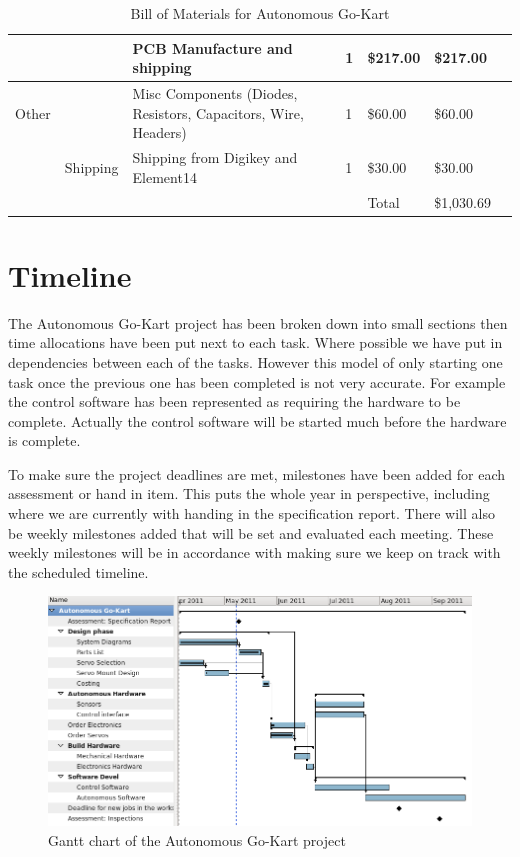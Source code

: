 \begin{table}[h]
\begin{center}
\begin{tabular}{ | l | l | p{} | l | l | l | l | }
      &  & PCB Manufacture and shipping & 1 & \$217.00 & \$217.00 \\
      \hline
      Other &  & Misc Components (Diodes, Resistors, Capacitors, Wire, Headers) & 1 & \$60.00 & \$60.00 \\
      & Shipping & Shipping from Digikey and Element14 & 1 & \$30.00 & \$30.00 \\
      \hline
      &  &  &  & Total & \$1,030.69 \\
      \hline
    \end{tabular}
  \end{center}
  \caption{Bill of Materials for Autonomous Go-Kart}
\end{table}



\section{Timeline}
The Autonomous Go-Kart project has been broken down into small sections then
time allocations have been put next to each task. Where possible we have put in
dependencies between each of the tasks. However this model of only starting one
task once the previous one has been completed is not very accurate. For example
the control software has been represented as requiring the hardware to be
complete. Actually the control software will be started much before the hardware
is complete.

To make sure the project deadlines are met, milestones have been added for each
assessment or hand in item. This puts the whole year in perspective, including
where we are currently with handing in the specification report. There will also
be weekly milestones added that will be set and evaluated each meeting. These
weekly milestones will be in accordance with making sure we keep on track with
the scheduled timeline.

  \begin{figure}[h]
    \centering
    \includegraphics[width=1.0\textwidth]{Images/Gantt.png}
    \caption{Gantt chart of the Autonomous Go-Kart project}
    \label{gantt_chart}
  \end{figure}

